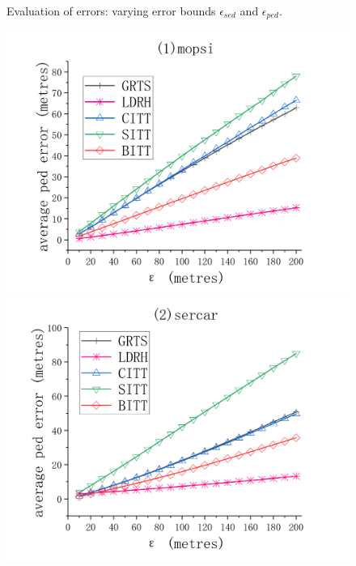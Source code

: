 {\begin{figure}[tb!]
	\vspace{-1ex}
	\caption{\small Evaluation of \sed errors: varying error bounds $\epsilon_{sed}$ and $\epsilon_{ped}$.}
	\label{fig:sed-error}
	\vspace{-1ex}
\end{figure}

\begin{figure}[tb!]
	\centering
	\includegraphics[scale = 0.580]{figures/Fig-mopsi-ped-error.png}\hspace{-1ex}
	\includegraphics[scale = 0.580]{figures/Fig-sercar-ped-error.png}\hspace{-1ex}

\end{figure}}
